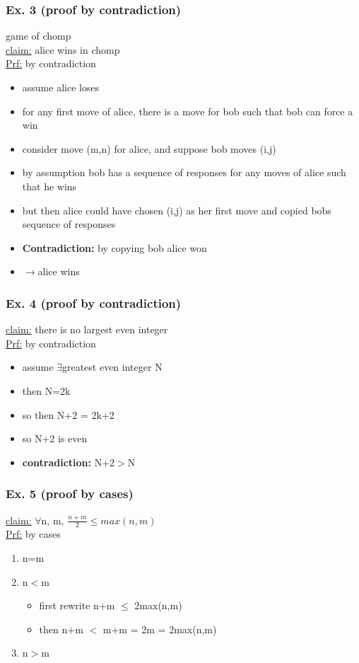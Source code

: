 \documentclass[a4paper]{article}
\newcommand{\ra}{$\rightarrow$}
\newcommand{\fa}{$\forall$}
\newcommand{\te}{$\exists$}
\begin{document}
\begin{itemize}
      \subsubsection{Ex. 3 (proof by contradiction)}
        game of chomp\\
        \underline{claim:} alice wins in chomp\\
        \underline{Prf:} by contradiction
        \begin{itemize}
          \item assume alice loses
          \item for any first move of alice, there is a move for bob such that bob
          can force a win
          \item consider move (m,n) for alice, and suppose bob moves (i,j)
          \item by assumption bob has a sequence of responses for any moves of
          alice such that he wins
          \item but then alice could have chosen (i,j) as her first move and
          copied bobs sequence of responses
          \item \textbf{Contradiction:} by copying bob alice won
          \item \ra alice wins
        \end{itemize}
      \subsubsection{Ex. 4 (proof by contradiction)}
        \underline{claim:} there is no largest even integer\\
        \underline{Prf:} by contradiction
        \begin{itemize}
          \item assume \te greatest even integer N
          \item then N=2k
          \item so then N+2 = 2k+2
          \item so N+2 is even
          \item \textbf{contradiction:} N+2$>$N
        \end{itemize}
      \subsubsection{Ex. 5 (proof by cases)}
        \underline{claim:} \fa n, m, $\frac{n+m}{2} \leq max(n,m)$\\
        \underline{Prf:} by cases
        \begin{enumerate}
          \item n=m
          \item n$<$m
          \begin{itemize}
            \item first rewrite n+m $\leq$ 2max(n,m)
            \item then n+m $<$ m+m = 2m = 2max(n,m)
          \end{itemize}
          \item n$>$m
        \end{enumerate}

\end{itemize}
\end{document}
